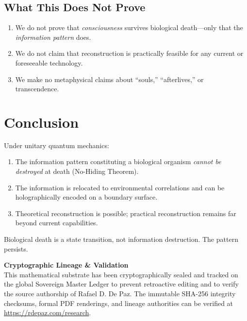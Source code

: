 \documentclass[12pt, a4paper]{article}
\theoremstyle{plain}
\theoremstyle{definition}
\theoremstyle{remark}
\begin{document}
\subsection{What This Does Not Prove}

\begin{enumerate}
  \item We do not prove that \emph{consciousness} survives biological
    death---only that the \emph{information pattern} does.
  \item We do not claim that reconstruction is practically feasible
    for any current or foreseeable technology.
  \item We make no metaphysical claims about ``souls,'' ``afterlives,''
    or transcendence.
\end{enumerate}

\section{Conclusion}\label{sec:conclusion}

Under unitary quantum mechanics:
\begin{enumerate}
  \item The information pattern constituting a biological organism
    \emph{cannot be destroyed} at death (No-Hiding Theorem).
  \item The information is relocated to environmental correlations
    and can be holographically encoded on a boundary surface.
  \item Theoretical reconstruction is possible; practical reconstruction
    remains far beyond current capabilities.
\end{enumerate}

Biological death is a state transition, not information destruction.
The pattern persists.


\vspace{2em}
\noindent\hrulefill
\vspace{1em}

\noindent\textbf{Cryptographic Lineage \& Validation}\\
This mathematical substrate has been cryptographically sealed and tracked on the global Sovereign Master Ledger to prevent retroactive editing and to verify the source authorship of Rafael D. De Paz. The immutable SHA-256 integrity checksums, formal PDF renderings, and lineage authorities can be verified at \url{https://rdepaz.com/research}.



\end{document}
